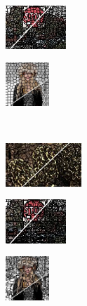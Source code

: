 \begin{figure}
\begin{subfigure}[b]{0.16\textwidth}
	\end{subfigure}
	\begin{subfigure}[b]{0.129\textwidth}
		\includegraphics[height=1.65cm]{pictures/sbd/slic/cropped/slic_6000067_contours}
	\end{subfigure}
	\begin{subfigure}[b]{0.10\textwidth}
		\includegraphics[height=1.65cm]{pictures/fash/slic/cropped/slic_132_contours}
	\end{subfigure}\\
	\begin{subfigure}[b]{0.02\textwidth}
	\end{subfigure}
	\begin{subfigure}[b]{0.16\textwidth}
		\includegraphics[height=1.65cm]{pictures/bsds500/crs/cropped/crs_208078_contours}
	\end{subfigure}
	\begin{subfigure}[b]{0.129\textwidth}
		\includegraphics[height=1.65cm]{pictures/sbd/crs/cropped/crs_6000067_contours}
	\end{subfigure}
	\begin{subfigure}[b]{0.10\textwidth}
		\includegraphics[height=1.65cm]{pictures/fash/crs/cropped/crs_132_contours}
	\end{subfigure}

\end{figure}
